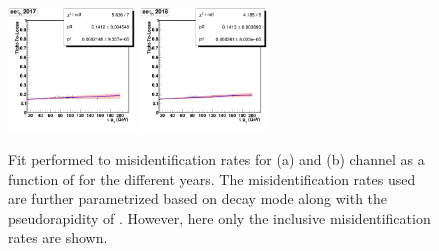 \begin{figure}[htbp]
{    \includegraphics[width=0.3\textwidth]{plots/chapter7/Fake/FR/EET2017.png}
    \includegraphics[width=0.3\textwidth]{plots/chapter7/Fake/FR/EET2018.png}
  }
  \caption{Fit performed to \tauh misidentification rates for \muhad (a) and \ehad (b) channel as a function of \tauh \pt for the different years. The misidentification rates used are further parametrized based on \tauh decay mode along with the pseudorapidity of \tauh. However, here only the inclusive misidentification rates are shown.}
  \label{fig:fakerate_tauh}
\end{figure}

